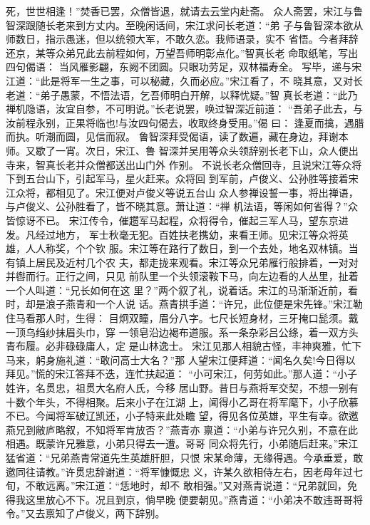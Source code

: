 死，世世相逢！”焚香已罢，众僧皆退，就请去云堂内赴斋。
众人斋罢，宋江与鲁智深跟随长老来到方丈内。至晚闲话间，宋江求问长老道：“弟
子与鲁智深本欲从师数日，指示愚迷，但以统领大军，不敢久恋。我师语录，实不
省悟。今者拜辞还京，某等众弟兄此去前程如何，万望吾师明彰点化。”智真长老
命取纸笔，写出四句偈语：
当风雁影翩，东阙不团圆。只眼功劳足，双林福寿全。
写毕，递与宋江道：“此是将军一生之事，可以秘藏，久而必应。”宋江看了，不
晓其意，又对长老道：“弟子愚蒙，不悟法语，乞吾师明白开解，以释忧疑。”智
真长老道：“此乃禅机隐语，汝宜自参，不可明说。”长老说罢，唤过智深近前道：
“吾弟子此去，与汝前程永别，正果将临也!与汝四句偈去，收取终身受用。”偈
曰：
逢夏而擒，遇腊而执。听潮而圆，见信而寂。
鲁智深拜受偈语，读了数遍，藏在身边，拜谢本师。又歇了一宵。次日，宋江、鲁
智深并吴用等众头领辞别长老下山，众人便出寺来，智真长老并众僧都送出山门外
作别。
不说长老众僧回寺，且说宋江等众将下到五台山下，引起军马，星火赶来。众将回
到军前，卢俊义、公孙胜等接着宋江众将，都相见了。宋江便对卢俊义等说五台山
众人参禅设誓一事，将出禅语，与卢俊义、公孙胜看了，皆不晓其意。萧让道：“禅
机法语，等闲如何省得？”众皆惊讶不已。
宋江传令，催趱军马起程，众将得令，催起三军人马，望东京进发。凡经过地方，
军士秋毫无犯。百姓扶老携幼，来看王师。见宋江等众将英雄，人人称奖，个个钦
服。宋江等在路行了数日，到一个去处，地名双林镇。当有镇上居民及近村几个农
夫，都走拢来观看。宋江等众兄弟雁行般排着，一对对并辔而行。正行之间，只见
前队里一个头领滚鞍下马，向左边看的人丛里，扯着一个人叫道：“兄长如何在这
里？”两个叙了礼，说着话。宋江的马渐渐近前，看时，却是浪子燕青和一个人说
话。燕青拱手道：“许兄，此位便是宋先锋。”宋江勒住马看那人时，生得：
目炯双瞳，眉分八字。七尺长短身材，三牙掩口髭须。戴一顶乌绉纱抹眉头巾，穿
一领皂沿边褐布道服。系一条杂彩吕公绦，着一双方头青布履。必非碌碌庸人，定
是山林逸士。
宋江见那人相貌古怪，丰神爽雅，忙下马来，躬身施礼道：“敢问高士大名？”那
人望宋江便拜道：“闻名久矣!今日得以拜见。”慌的宋江答拜不迭，连忙扶起道：
“小可宋江，何劳如此。”那人道：“小子姓许，名贯忠，祖贯大名府人氏，今移
居山野。昔日与燕将军交契，不想一别有十数个年头，不得相聚。后来小子在江湖
上，闻得小乙哥在将军麾下，小子欣慕不已。今闻将军破辽凯还，小子特来此处瞻
望，得见各位英雄，平生有幸。欲邀燕兄到敝庐略叙，不知将军肯放否？”燕青亦
禀道：“小弟与许兄久别，不意在此相遇。既蒙许兄雅意，小弟只得去一遭。哥哥
同众将先行，小弟随后赶来。”宋江猛省道：“兄弟燕青常道先生英雄肝胆，只恨
宋某命薄，无缘得遇。今承垂爱，敢邀同往请教。”许贯忠辞谢道：“将军慷慨忠
义，许某久欲相侍左右，因老母年过七旬，不敢远离。”宋江道：“恁地时，却不
敢相强。”又对燕青说道：“兄弟就回，免得我这里放心不下。况且到京，倘早晚
便要朝见。”燕青道：“小弟决不敢违哥哥将令。”又去禀知了卢俊义，两下辞别。
